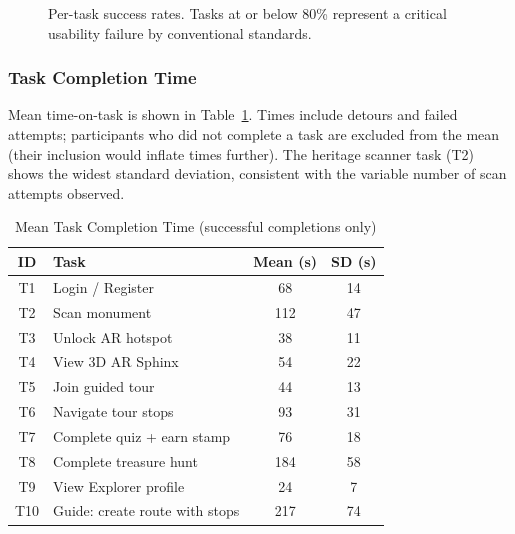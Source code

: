 \begin{figure}[htbp]
  \centering
  \caption{Per-task success rates. Tasks at or below 80\% represent a critical usability
  failure by conventional standards.}
  \label{fig:success-bar}
\end{figure}

\subsubsection{Task Completion Time}

Mean time-on-task is shown in Table~\ref{tab:time}. Times include detours and failed
attempts; participants who did not complete a task are excluded from the mean (their
inclusion would inflate times further). The heritage scanner task (T2) shows the
widest standard deviation, consistent with the variable number of scan attempts
observed.

\begin{table}[htbp]
  \centering
  \caption{Mean Task Completion Time (successful completions only)}
  \label{tab:time}
  \begin{tabular}{clcc}
    \toprule
    \textbf{ID} & \textbf{Task}                 & \textbf{Mean (s)} & \textbf{SD (s)} \\
    \midrule
    T1  & Login / Register               &  68 &  14 \\
    T2  & Scan monument                  & 112 &  47 \\
    T3  & Unlock AR hotspot              &  38 &  11 \\
    T4  & View 3D AR Sphinx              &  54 &  22 \\
    T5  & Join guided tour               &  44 &  13 \\
    T6  & Navigate tour stops            &  93 &  31 \\
    T7  & Complete quiz + earn stamp     &  76 &  18 \\
    T8  & Complete treasure hunt         & 184 &  58 \\
    T9  & View Explorer profile          &  24 &   7 \\
    T10 & Guide: create route with stops & 217 &  74 \\
    \bottomrule
  \end{tabular}
\end{table}

